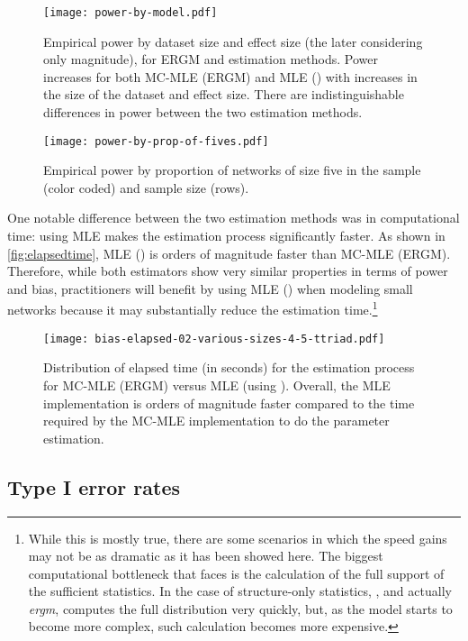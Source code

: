 \documentclass[12pt]{article}
\begin{document}
\begin{figure}[ht]
	\centering
	\caption{\label{fig:power}Empirical power by dataset size and effect size (the later considering only magnitude), for ERGM and \ergmito{} estimation methods. Power increases for both MC-MLE (ERGM) and MLE (\ergmito{}) with increases in the size of the dataset and effect size. There are indistinguishable differences in power between the two estimation methods.}
	\texttt{[image: power-by-model.pdf]}
\end{figure}

\begin{figure}[ht]
	\centering
	\caption{\label{fig:power-prop5s}Empirical power by proportion of networks of size five in the sample (color coded) and sample size (rows).}
	\texttt{[image: power-by-prop-of-fives.pdf]}
\end{figure}

One notable difference between the two estimation methods was in computational time: using MLE makes the estimation process significantly faster. As shown in \autoref{fig:elapsedtime}, MLE (\ergmito{}) is orders of magnitude faster than MC-MLE (ERGM). Therefore, while both estimators show very similar properties in terms of power and bias, practitioners will benefit by using MLE (\ergmito{}) when modeling small networks because it may substantially reduce the estimation time.\footnote{While this is mostly true, there are some scenarios in which the speed gains may not be as dramatic as it has been showed here. The biggest computational bottleneck that \ergmito{} faces is the calculation of the full support of the sufficient statistics. In the case of structure-only statistics, \ergmito{}, and actually \textit{ergm}, computes the full distribution very quickly, but, as the model starts to become more complex, such calculation becomes more expensive.}

\begin{figure}
	\centering
	\caption{\label{fig:elapsedtime}Distribution of elapsed time (in seconds) for the estimation process for MC-MLE (ERGM) versus MLE (using \ergmito{}). Overall, the MLE implementation is orders of magnitude faster compared to the time required by the MC-MLE implementation to do the parameter estimation.}
	\texttt{[image: bias-elapsed-02-various-sizes-4-5-ttriad.pdf]}
\end{figure}





\subsection{Type I error rates}
\end{document}

